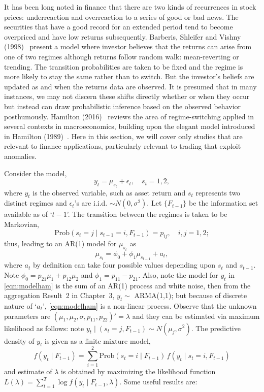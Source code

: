 It has been long noted in finance that there are two kinds of recurrences in stock prices: underreaction and overreaction to a series of good or bad news. The securities that have a good record for an extended period tend to become overpriced and have low returns subsequently. Barberis, Shleifer and Vishny (1998)~\cite{vishny} present a model where investor believes that the returns can arise from one of two regimes although returns follow random walk: mean-reverting or trending. The transition probabilities are taken to be fixed and the regime is more likely to stay the same rather than to switch. But the investor's beliefs are updated as and when the returns data are observed. It is presumed that in many instances, we may not discern these shifts directly whether or when they occur but instead can draw probabilistic inference based on the observed behavior posthumously. Hamilton (2016)~\cite{jdham} reviews the area of regime-switching applied in several contexts in macroeconomics, building upon the elegant model introduced in Hamilton (1989)~\cite{89ham}. Here in this section, we will cover only studies that are relevant to finance applications, particularly relevant to trading that exploit anomalies. 


Consider the model,
	\begin{equation} \label{eqn:modelham}
	y_t = \mu_{s_t} + \epsilon_t, \quad s_t= 1, 2,
	\end{equation} 
where $y_t$ is the observed variable, such as asset return and $s_t$ represents two distinct regimes and $\epsilon_t$'s are i.i.d. $\sim N(0,\sigma^2)$. Let $\{ F_{t-1} \}$ be the information set available as of `$t-1$'. The transition between the regimes is taken to be Markovian,
	\begin{equation} \label{eqn:markprob}
	\text{Prob}(s_t= j \;|\; s_{t-1}= i, F_{t-1}) = p_{ij}, \quad i,j= 1, 2;
	\end{equation}
thus, leading to an AR(1) model for $\mu_{s_t}$ as
	\begin{equation} \label{eqn:must}
	\mu_{s_t} = \phi_0 + \phi_1 \mu_{s_{t-1}} + a_t,
	\end{equation}
where $a_t$ by definition can take four possible values depending upon $s_t$ and $s_{t-1}$. Note $\phi_0= p_{21} \mu_1 + p_{12} \mu_2$ and $\phi_1= p_{11} - p_{21}$. Also, note the model for $y_t$ in \eqref{eqn:modelham} is the sum of an AR(1) process and white noise, then from the aggregation Result~2 in Chapter~3, $y_t \sim$ ARMA(1,1); but because of discrete nature of `$a_t$', \eqref{eqn:modelham} is a non-linear process. Observe that the unknown parameters are $(\mu_1, \mu_2, \sigma,p_{11}, p_{22})'= \lambda$ and they can be estimated via maximum likelihood as follows: note $y_t \;|\; (s_t= j, F_{t-1}) \sim N(\mu_j,\sigma^2)$. The predictive density of $y_t$ is given as a finite mixture model,
	\begin{equation}\label{eqn:predden}
	f(y_t \;|\; F_{t-1})= \sum_{i=1}^2 \text{Prob}(s_t= i \;|\; F_{t-1}) \, f(y_t \;|\; s_t= i, F_{t-1})
	\end{equation}
and estimate of $\lambda$ is obtained by maximizing the likelihood function $L(\lambda)= \sum_{t=1}^T \log f(y_t \;|\; F_{t-1}, \lambda)$. Some useful results are: \twomedskip


